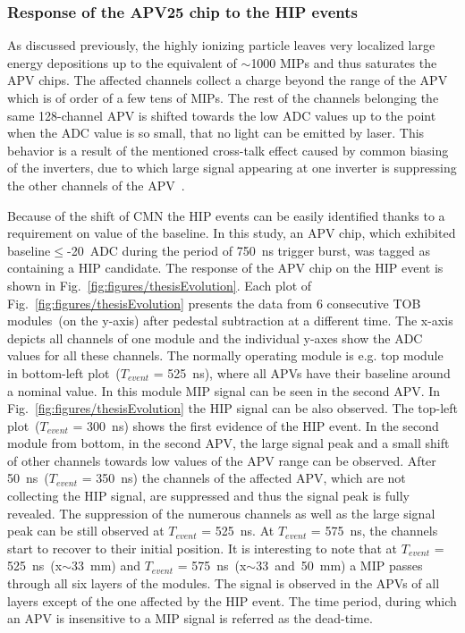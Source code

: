 

\subsubsection{Response of the APV25 chip to the HIP events}

As discussed previously, the highly ionizing particle leaves very localized large energy depositions up to the equivalent of $\sim$1000 MIPs and thus saturates the APV chips. The affected channels collect a charge beyond the range of the APV which is of order of a few tens of MIPs. The rest of the channels belonging the same 128-channel APV is shifted towards the low ADC values up to the point when the ADC value is so small, that no light can be emitted by laser. This behavior is a result of the mentioned cross-talk effect caused by common biasing of the inverters, due to which large signal appearing at one inverter is suppressing the other channels of the APV~\cite{Bainbridge:2004jc}. 

Because of the shift of CMN the HIP events can be easily identified thanks to a requirement on value of the baseline. In this study, an APV chip, which exhibited baseline$\leq$-20~ADC during the period of 750~ns trigger burst, was tagged as containing a  HIP candidate. The response of the APV chip on the HIP event is shown in Fig.~\ref{fig:figures/thesisEvolution}. Each plot of Fig.~\ref{fig:figures/thesisEvolution} presents the data from 6 consecutive TOB modules~(on the y-axis) after pedestal subtraction at a different time. The x-axis depicts all channels of one module and the individual y-axes show the ADC values for all these channels. The normally operating module is e.g. top module in bottom-left plot~($T_{event}$ = 525~ns), where all APVs have their baseline around a nominal value. In this module MIP signal can be seen in the second APV. In Fig.~\ref{fig:figures/thesisEvolution} the HIP signal can be also observed. The top-left plot~($T_{event}$ = 300~ns) shows the first evidence of the HIP event. In the second module from bottom, in the second APV, the large signal peak and a small shift of other channels towards low values of the APV range can be observed. After 50~ns~($T_{event}$ = 350~ns) the channels of the affected APV, which are not collecting the HIP signal, are suppressed and thus the signal peak is fully revealed. The suppression of the numerous channels as well as the large signal peak can be still observed at $T_{event}$ = 525~ns. At $T_{event}$ = 575~ns, the channels start to recover to their initial position. It is interesting to note that at $T_{event}$ = 525~ns~(x$\sim$33~mm) and $T_{event}$ = 575~ns~(x$\sim$33~and~50~mm) a MIP passes through all six layers of the modules. The signal is observed in the APVs of all layers except of the one affected by the HIP event. The time period, during which an APV is insensitive to a MIP signal is referred as the dead-time.

